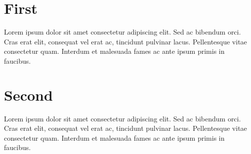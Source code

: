 \documentclass[11pt, a4paper]{report}
\begin{document}
\begin{appendices}

\chapter{First}
\par Lorem ipsum dolor sit amet consectetur adipiscing elit. Sed ac bibendum orci. Cras erat elit, consequat vel erat ac, tincidunt pulvinar lacus. Pellentesque vitae consectetur quam. Interdum et malesuada fames ac ante ipsum primis in faucibus.
\clearpage

\chapter{Second}
\par Lorem ipsum dolor sit amet consectetur adipiscing elit. Sed ac bibendum orci. Cras erat elit, consequat vel erat ac, tincidunt pulvinar lacus. Pellentesque vitae consectetur quam. Interdum et malesuada fames ac ante ipsum primis in faucibus.
\clearpage

\end{appendices}
\end{document}
